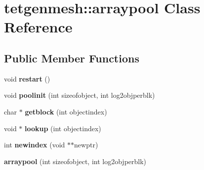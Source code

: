 \hypertarget{classtetgenmesh_1_1arraypool}{}\section{tetgenmesh\+:\+:arraypool Class Reference}
\label{classtetgenmesh_1_1arraypool}
\subsection*{Public Member Functions}
\begin{DoxyCompactItemize}
\item 
\mbox{\label{classtetgenmesh_1_1arraypool_a19030126ef81a9ff3c4aca35f0347cdc}} 
void {\bfseries restart} ()
\item 
\mbox{\label{classtetgenmesh_1_1arraypool_a3069be62301a28c1e89201008e838cf8}} 
void {\bfseries poolinit} (int sizeofobject, int log2objperblk)
\item 
\mbox{\label{classtetgenmesh_1_1arraypool_a3389d606b99e572c2d381fa51bc3793b}} 
char $\ast$ {\bfseries getblock} (int objectindex)
\item 
\mbox{\label{classtetgenmesh_1_1arraypool_af7ead1b15097f61c7082568ce1121f05}} 
void $\ast$ {\bfseries lookup} (int objectindex)
\item 
\mbox{\label{classtetgenmesh_1_1arraypool_afb546c70f7728e3e0d58e2aada464437}} 
int {\bfseries newindex} (void $\ast$$\ast$newptr)
\item 
\mbox{\label{classtetgenmesh_1_1arraypool_a62a21b86eafefd79c951e85a9b180d0f}} 
{\bfseries arraypool} (int sizeofobject, int log2objperblk)
\end{DoxyCompactItemize}
